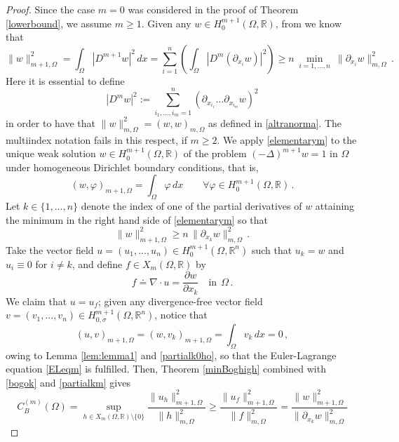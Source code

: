 \documentclass[11pt]{article}
\theoremstyle{plain}
\theoremstyle{definition}
\numberwithin{equation}{section}
\begin{document}
\begin{proof}
Since the case $m=0$ was considered in the proof of Theorem \ref{lowerbound}, we assume $m \geq 1$.
Given any $w\in H^{m+1}_{0}(\Omega, \mathbb{R})$, from \cite[Formula (2.12)]{GGSbook} we know that
	\begin{equation}\label{elementarym}
		\| w \|^{2}_{m+1, \Omega} = \int_\Omega|D^{m+1} w|^2\, dx=\sum_{i=1}^{n} \left( \int_\Omega \left| D^{m}(\partial_{x_i} w) \right|^2 \right)
		\ge n\ \min_{i=1,...,n} \ \| \partial_{x_i} w \|^{2}_{m, \Omega} \, .
	\end{equation}
	Here it is essential to define
	$$
	|D^{m} w|^2:=\sum^n_{i_1,\ldots,i_m=1} (\partial_{x_{i_1}}\ldots \partial_{x_{i_m}} w)^2
	$$
	in order to have that  $\| w \|^{2}_{m, \Omega}=(w,w)_{m, \Omega}$ as defined in \eqref{altranorma}. The multiindex notation fails in this respect, if $m\ge 2$.
We apply \eqref{elementarym} to the unique weak solution $w\in H^{m+1}_{0}(\Omega, \mathbb{R})$ of the problem
$(-\Delta)^{m+1} w=1$ in $\Omega$ under homogeneous Dirichlet boundary conditions, that is,
	\begin{equation}\label{partialk0ho}
		(w, \varphi)_{m+1,\Omega} = \int_\Omega \varphi \, dx\qquad \forall \varphi \in H^{m+1}_{0}(\Omega, \mathbb{R}) \, .
	\end{equation}
Let $k\in\{1,...,n\}$ denote the index of one of the partial derivatives of $w$ attaining the minimum in the right hand side
of \eqref{elementarym} so that
	\begin{equation}\label{partialkm}
	\| w \|^{2}_{m+1, \Omega} \geq n \, \| \partial_{x_k} w \|^{2}_{m, \Omega} \, .
	\end{equation}
	Take the vector field $u=(u_1,...,u_n)\in H^{m+1}_{0}(\Omega, \mathbb{R}^{n})$ such that $u_k=w$ and $u_i\equiv0$ for $i\neq k$, and define $f \in X_{m}(\Omega, \mathbb{R})$ by
	$$
	f\doteq\nabla\cdot u=\dfrac{\partial w}{\partial x_{k}} \quad \text{in} \ \ \Omega \, .
	$$
	We claim that $u = u_f$; given any divergence-free vector field $v = (v_{1},...,v_{n}) \in H^{m+1}_{0, \sigma}(\Omega, \mathbb{R}^{n})$, notice that
	$$
	(u, v)_{m+1,\Omega} = (w, v_{k})_{m+1,\Omega} = \int_{\Omega} v_{k} \, dx = 0 \, ,
	$$
	owing to Lemma \ref{lem:lemma1} and \eqref{partialk0ho}, so that the Euler-Lagrange equation \eqref{ELeqm} is fulfilled. Then, Theorem \ref{minBoghigh} combined with \eqref{bogok} and \eqref{partialkm} gives
	$$
	C_B^{(m)}(\Omega)=\sup_ {h\in X_{m}(\Omega, \mathbb{R}) \setminus \{0\}}\frac{\|u_h\|_{m+1, \Omega}^{2}}{\|h\|_{m, \Omega}^{2}} \geq \frac{\|u_f\|_{m+1, \Omega}^{2}}{\|f\|_{m, \Omega}^{2}}=\frac{\|w\|_{m+1, \Omega}^{2}}{\|\partial_{x_k} w\|_{m, \Omega}^{2}}
$$
\end{proof}
\end{document}
